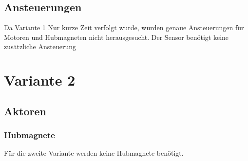 \subsection{Ansteuerungen}
Da Variante 1 Nur kurze Zeit verfolgt wurde, wurden genaue Ansteuerungen für Motoren und Hubmagneten nicht herausgesucht. Der Sensor benötigt keine zusätzliche Ansteuerung

\section{Variante 2}
\subsection{Aktoren}
\subsubsection{Hubmagnete}
Für die zweite Variante werden keine Hubmagnete benötigt.

